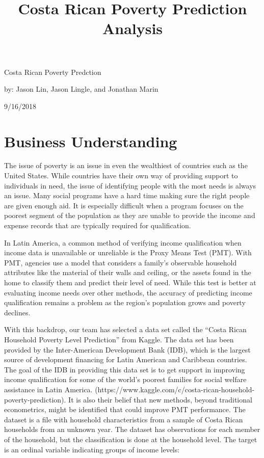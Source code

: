 \documentclass[11pt]{article}
\title{Costa Rican Poverty Prediction Analysis}
\begin{document}
    
    
    \maketitle
    
    

    
    

    Costa Rican Poverty Predction

by: Jason Lin, Jason Lingle, and Jonathan Marin

9/16/2018

    \section{Business Understanding}\label{business-understanding}

The issue of poverty is an issue in even the wealthiest of countries
such as the United States. While countries have their own way of
providing support to individuals in need, the issue of identifying
people with the most needs is always an issue. Many social programs have
a hard time making sure the right people are given enough aid. It is
especially difficult when a program focuses on the poorest segment of
the population as they are unable to provide the income and expense
records that are typically required for qualification.

In Latin America, a common method of verifying income qualification when
income data is unavailable or unreliable is the Proxy Means Test (PMT).
With PMT, agencies use a model that considers a family's observable
household attributes like the material of their walls and ceiling, or
the assets found in the home to classify them and predict their level of
need. While this test is better at evaluating income needs over other
methods, the accuracy of predicting income qualification remains a
problem as the region's population grows and poverty declines.

With this backdrop, our team has selected a data set called the ``Costa
Rican Household Poverty Level Prediction'' from Kaggle. The data set has
been provided by the Inter-American Development Bank (IDB), which is the
largest source of development financing for Latin American and Caribbean
countries. The goal of the IDB in providing this data set is to get
support in improving income qualification for some of the world's
poorest families for social welfare assistance in Latin America.
(https://www.kaggle.com/c/costa-rican-household-poverty-prediction). It
is also their belief that new methods, beyond traditional econometrics,
might be identified that could improve PMT performance. The dataset is a
file with household characteristics from a sample of Costa Rican
households from an unknown year. The dataset has observations for each
member of the household, but the classification is done at the household
level. The target is an ordinal variable indicating groups of income
levels:
\end{document}
